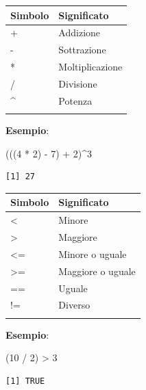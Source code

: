 \documentclass[
  ignorenonframetext,
  compress, aspectratio=149]{beamer}
\newenvironment{Shaded}{}{}
\newcommand{\DecValTok}[1]{\textcolor[rgb]{0.69,0.50,0.00}{#1}}
\newcommand{\NormalTok}[1]{\textcolor[rgb]{0.12,0.11,0.11}{#1}}
\newcommand{\SpecialCharTok}[1]{\textcolor[rgb]{0.24,0.68,0.91}{#1}}
\begin{document}
\begin{frame}[fragile]{}
\label{section-4}
\begin{longtable}[]{@{}ll@{}}
\toprule\noalign{}
Simbolo & Significato \\
\midrule\noalign{}
\endhead
+ & Addizione \\
- & Sottrazione \\
* & Moltiplicazione \\
/ & Divisione \\
\^{} & Potenza \\
\bottomrule\noalign{}
\end{longtable}

\textbf{Esempio}:

\begin{Shaded}
\begin{Highlighting}[]
\NormalTok{(((}\DecValTok{4} \SpecialCharTok{*} \DecValTok{2}\NormalTok{) }\SpecialCharTok{{-}} \DecValTok{7}\NormalTok{) }\SpecialCharTok{+} \DecValTok{2}\NormalTok{)}\SpecialCharTok{\^{}}\DecValTok{3}
\end{Highlighting}
\end{Shaded}

\pause

\begin{verbatim}
[1] 27
\end{verbatim}
\end{frame}

\begin{frame}[fragile]{}
\label{section-5}
\begin{longtable}[]{@{}ll@{}}
\toprule\noalign{}
Simbolo & Significato \\
\midrule\noalign{}
\endhead
\textless{} & Minore \\
\textgreater{} & Maggiore \\
\textless= & Minore o uguale \\
\textgreater= & Maggiore o uguale \\
== & Uguale \\
!= & Diverso \\
\bottomrule\noalign{}
\end{longtable}

\small

\textbf{Esempio}:

\begin{Shaded}
\begin{Highlighting}[]
\NormalTok{(}\DecValTok{10} \SpecialCharTok{/} \DecValTok{2}\NormalTok{) }\SpecialCharTok{\textgreater{}} \DecValTok{3}
\end{Highlighting}
\end{Shaded}

\begin{verbatim}
[1] TRUE
\end{verbatim}
\end{frame}
\end{document}
